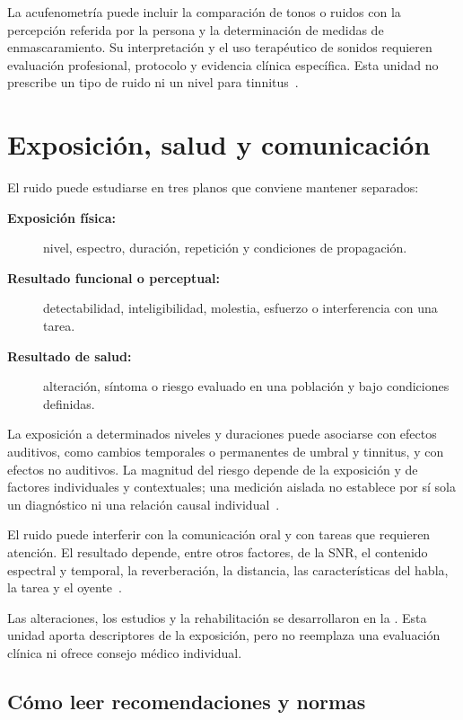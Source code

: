 La acufenometría puede incluir la comparación de tonos o ruidos con la
percepción referida por la persona y la determinación de medidas de
enmascaramiento. Su interpretación y el uso terapéutico de sonidos requieren
evaluación profesional, protocolo y evidencia clínica específica. Esta unidad
no prescribe un tipo de ruido ni un nivel para tinnitus~\cite{ashaTinnitus}.

\section{Exposición, salud y comunicación}
\label{sec:u10-efectos}

El ruido puede estudiarse en tres planos que conviene mantener separados:
\begin{description}
    \item[\textbf{Exposición física:}] nivel, espectro, duración, repetición y
    condiciones de propagación.
    \item[\textbf{Resultado funcional o perceptual:}] detectabilidad,
    inteligibilidad, molestia, esfuerzo o interferencia con una tarea.
    \item[\textbf{Resultado de salud:}] alteración, síntoma o riesgo evaluado
    en una población y bajo condiciones definidas.
\end{description}

La exposición a determinados niveles y duraciones puede asociarse con
efectos auditivos, como cambios temporales o permanentes de umbral y tinnitus,
y con efectos no auditivos. La magnitud del riesgo depende de la exposición y
de factores individuales y contextuales; una medición aislada no establece
por sí sola un diagnóstico ni una relación causal individual~\cite{whoEnvNoise2018,nioshNoise1998}.

El ruido puede interferir con la comunicación oral y con tareas que
requieren atención. El resultado depende, entre otros factores, de la SNR, el
contenido espectral y temporal, la reverberación, la distancia, las
características del habla, la tarea y el oyente~\cite{whoEnvNoise2018,nioshNoise1998}.

Las alteraciones, los estudios y la rehabilitación se desarrollaron en la
. Esta unidad aporta descriptores de la exposición,
pero no reemplaza una evaluación clínica ni ofrece consejo médico individual.

\subsection{Cómo leer recomendaciones y normas}
\label{sec:u10-normativa}

